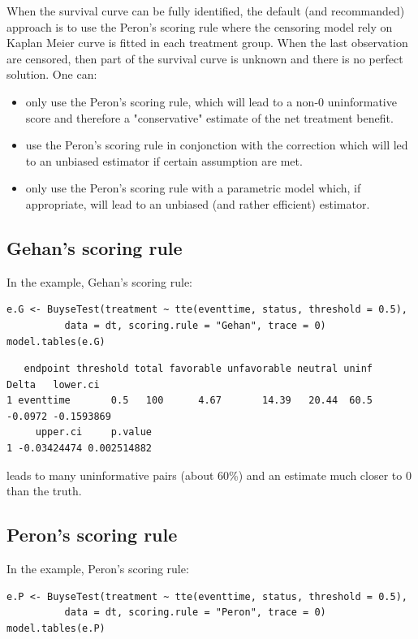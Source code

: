 \documentclass[12pt]{article}
\begin{document}
When the survival curve can be fully identified, the default (and
recommanded) approach is to use the Peron's scoring rule where the
censoring model rely on Kaplan Meier curve is fitted in each treatment
group. When the last observation are censored, then part of the
survival curve is unknown and there is no perfect solution. One can:
\begin{itemize}
\item only use the Peron's scoring rule, which will lead to a non-0
uninformative score and therefore a "conservative" estimate of the net treatment benefit.
\item use the Peron's scoring rule in conjonction with the correction
which will led to an unbiased estimator if certain assumption are met.
\item only use the Peron's scoring rule with a parametric model which, if
appropriate, will lead to an unbiased (and rather efficient)
estimator.
\end{itemize}

\subsection{Gehan's scoring rule}
\label{sec:org4b7e08b}
In the example, Gehan's scoring rule:
\lstset{language=r,label= ,caption= ,captionpos=b,numbers=none}
\begin{lstlisting}
e.G <- BuyseTest(treatment ~ tte(eventtime, status, threshold = 0.5),
          data = dt, scoring.rule = "Gehan", trace = 0)
model.tables(e.G)
\end{lstlisting}

\begin{verbatim}
   endpoint threshold total favorable unfavorable neutral uninf   Delta   lower.ci
1 eventtime       0.5   100      4.67       14.39   20.44  60.5 -0.0972 -0.1593869
     upper.ci     p.value
1 -0.03424474 0.002514882
\end{verbatim}


leads to many uninformative pairs (about 60\%) and an estimate much
closer to 0 than the truth.

\subsection{Peron's scoring rule}
\label{sec:org38edb6d}
In the example, Peron's scoring rule:
\lstset{language=r,label= ,caption= ,captionpos=b,numbers=none}
\begin{lstlisting}
e.P <- BuyseTest(treatment ~ tte(eventtime, status, threshold = 0.5),
          data = dt, scoring.rule = "Peron", trace = 0)
model.tables(e.P)
\end{lstlisting}
\end{document}

